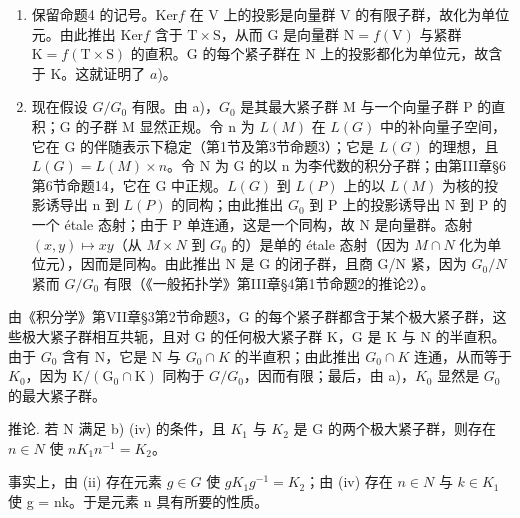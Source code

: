 \begin{enumerate}
\def\labelenumi{\alph{enumi})}
\item
  保留命题4 的记号。\(\mathrm{Ker}f\) 在 V 上的投影是向量群 V 的有限子群，故化为单位元。由此推出 \(\mathrm{Ker}f\) 含于 \(\mathrm{T} \times \mathrm{S}\)，从而 G 是向量群 \(\mathrm{N} = f(\mathrm{V})\) 与紧群 \(\mathrm{K} = f(\mathrm{T} \times \mathrm{S})\) 的直积。G 的每个紧子群在 N 上的投影都化为单位元，故含于 K。这就证明了 \(a\))。
\item
  现在假设 \(G/G_{0}\) 有限。由 a)，\(G_{0}\) 是其最大紧子群 M 与一个向量子群 P 的直积；G 的子群 M 显然正规。令 n 为 \(L(M)\) 在 \(L(G)\) 中的补向量子空间，它在 G 的伴随表示下稳定（第1节及第3节命题3）；它是 \(L(G)\) 的理想，且 \(L(G) = L(M) \times n\)。令 N 为 G 的以 n 为李代数的积分子群；由第III章§6第6节命题14，它在 G 中正规。\(L(G)\) 到 \(L(P)\) 上的以 \(L(M)\) 为核的投影诱导出 n 到 \(L(P)\) 的同构；由此推出 \(G_{0}\) 到 P 上的投影诱导出 N 到 P 的一个 étale 态射；由于 P 单连通，这是一个同构，故 N 是向量群。态射 \((x, y) \mapsto xy\)（从 \(M \times N\) 到 \(G_{0}\) 的）是单的 étale 态射（因为 \(M \cap N\) 化为单位元），因而是同构。由此推出 N 是 G 的闭子群，且商 G/N 紧，因为 \(G_{0}/N\) 紧而 \(G/G_{0}\) 有限（《一般拓扑学》第III章§4第1节命题2的推论2）。
\end{enumerate}

由《积分学》第VII章§3第2节命题3，G 的每个紧子群都含于某个极大紧子群，这些极大紧子群相互共轭，且对 G 的任何极大紧子群 K，G 是 K 与 N 的半直积。由于 \(G_{0}\) 含有 N，它是 N 与 \(G_{0} \cap K\) 的半直积；由此推出 \(G_{0} \cap K\) 连通，从而等于 \(K_{0}\)，因为 \(\mathrm{K}/(\mathrm{G}_{0} \cap \mathrm{K})\) 同构于 \(G/G_{0}\)，因而有限；最后，由 a)，\(K_{0}\) 显然是 \(G_{0}\) 的最大紧子群。

推论. 若 N 满足 b) (iv) 的条件，且 \(K_{1}\) 与 \(K_{2}\) 是 G 的两个极大紧子群，则存在 \(n \in N\) 使 \(nK_{1}n^{-1} = K_{2}\)。

事实上，由 (ii) 存在元素 \(g \in G\) 使 \(gK_{1}g^{-1} = K_{2}\)；由 (iv) 存在 \(n \in N\) 与 \(k \in K_{1}\) 使 g = nk。于是元素 n 具有所要的性质。

